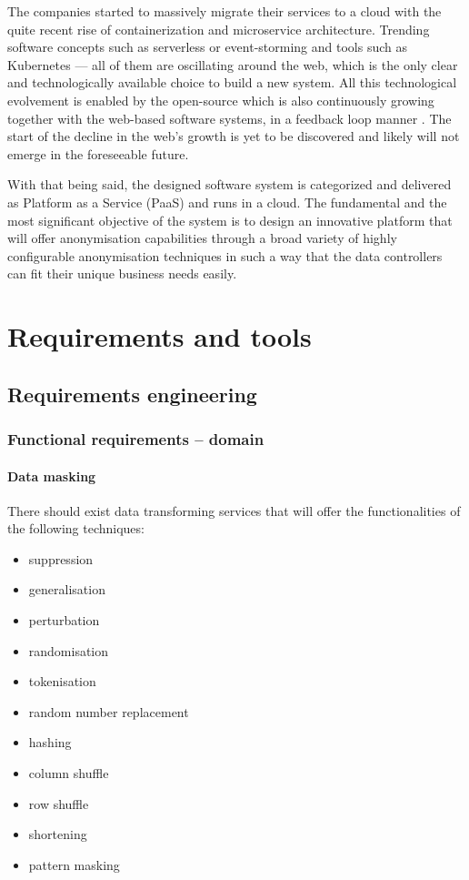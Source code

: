 \documentclass[a4paper,twoside,12pt]{book}
\begin{document}
The companies started to massively migrate their services to a cloud with the quite recent rise of containerization and microservice architecture. Trending software concepts such as serverless or event-storming and tools such as Kubernetes — all of them are oscillating around the web, which is the only clear and technologically available choice to build a new system. All this technological evolvement is enabled by the open-source which is also continuously growing together with the web-based software systems, in a feedback loop manner \cite{bib:distributed_systems}. The start of the decline in the web's growth is yet to be discovered and likely will not emerge in the foreseeable future.

With that being said, the designed software system is categorized and delivered as Platform as a Service (PaaS) and runs in a cloud. The fundamental and the most significant objective of the system is to design an innovative platform that will offer anonymisation capabilities through a broad variety of highly configurable anonymisation techniques in such a way that the data controllers can fit their unique business needs easily.

\chapter{Requirements and tools}

\section{Requirements engineering}

\subsection{Functional requirements – domain}

\subsubsection{Data masking}

There should exist data transforming services that will offer the functionalities of the following techniques:
\begin{itemize}
\item suppression
\item generalisation
\item perturbation
\item randomisation
\item tokenisation
\item random number replacement
\item hashing
\item column shuffle
\item row shuffle
\item shortening
\item pattern masking
\end{itemize}
\end{document}
